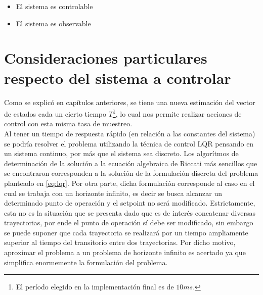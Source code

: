 \documentclass[main]{subfiles}
\begin{document}
\begin{itemize}
\item El sistema es controlable
\item El sistema es observable
\end{itemize}

\section{Consideraciones particulares respecto del sistema a controlar}

Como se explic\'o en cap\'itulos anteriores, se tiene una nueva estimaci\'on del vector de estados cada un cierto tiempo $T$\footnote{El per\'iodo elegido en la implementaci\'on final es de $10ms$.}, lo cual nos permite realizar acciones de control con esta misma tasa de muestreo. \\

Al tener un tiempo de respuesta r\'apido (en relaci\'on a las constantes del sistema) se podr\'ia resolver el problema utilizando la t\'ecnica de control LQR pensando en un sistema continuo, por m\'as que el sistema sea discreto. Los algor\'itmos de determinaci\'on de la soluci\'on a la ecuaci\'on algebraica de Riccati m\'as sencillos que se encontraron corresponden a la soluci\'on de la formulaci\'on discreta del problema planteado en \ref{eq:lqr}. Por otra parte, dicha formulaci\'on corresponde al caso en el cual se trabaja con un horizonte infinito, es decir se busca alcanzar un determinado punto de operaci\'on y el setpoint no ser\'a modificado. Estrictamente, esta no es la situaci\'on que se presenta dado que es de inter\'es concatenar diversas trayectorias, por ende el punto de operaci\'on s\'i debe ser modificado, sin embargo se puede suponer que cada trayectoria se realizar\'a por un tiempo ampliamente superior al tiempo del transitorio entre dos trayectorias. Por dicho motivo, aproximar el problema a un problema de horizonte infinito es acertado ya que simplifica enormemente la formulaci\'on del problema.
\end{document}
